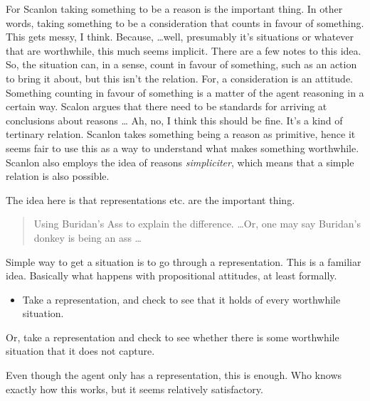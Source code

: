 \documentclass[10pt]{article}
\begin{document}
For Scanlon taking something to be a reason is the important thing.
In other words, taking something to be a consideration that counts in favour of something.
This gets messy, I think.
Because, \dots well, presumably it's situations or whatever that are worthwhile, this much seems implicit.
There are a few notes to this idea.
So, the situation can, in a sense, count in favour of something, such as an action to bring it about, but this isn't the relation.
For, a consideration is an attitude.
Something counting in favour of something is a matter of the agent reasoning in a certain way.
Scalon argues that there need to be standards for arriving at conclusions about reasons \dots
Ah, no, I think this should be fine.
It's a kind of tertinary relation.
Scanlon takes something being a reason as primitive, hence it seems fair to use this as a way to understand what makes something worthwhile.
Scanlon also employs the idea of reasons \emph{simpliciter}, which means that a simple relation is also possible.

The idea here is that representations etc. are the important thing.


\begin{quote}
  Using Buridan's Ass to explain the difference.
  \dots Or, one may say Buridan's donkey is being an ass \dots
\end{quote}



Simple way to get a situation is to go through a representation.
This is a familiar idea.
Basically what happens with propositional attitudes, at least formally.

\begin{itemize}
\item Take a representation, and check to see that it holds of every worthwhile situation.
\end{itemize}
Or, take a representation and check to see whether there is some worthwhile situation that it does not capture.



Even though the agent only has a representation, this is enough.
Who knows exactly how this works, but it seems relatively satisfactory.



\end{document}
